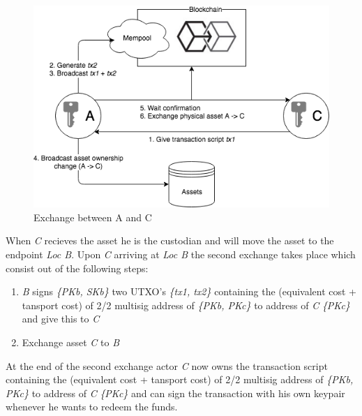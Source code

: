 \begin{figure}[h]
\centering
\includegraphics[width=1\textwidth]{images/exchange_01.png}
\caption{Exchange between A and C}
\label{fig:2 first exchange}
\end{figure}

 When \textit{C} recieves the asset he is the custodian and will move the asset to the endpoint \textit{Loc B}. Upon \textit{C} arriving at \textit{Loc B} the second exchange takes place which consist out of the following steps:

\begin{enumerate}
  \item \textit{B} signs \textit{\{PKb, SKb\}} two UTXO's \textit{\{tx1, tx2\}} containing the (equivalent cost + tansport cost) of 2/2 multisig address of \textit{\{PKb, PKc\}} to address of \textit{C} \textit{\{PKc\}} and give this to \textit{C}
  \item Exchange asset \textit{C} to \textit{B}
\end{enumerate}

At the end of the second exchange actor \textit{C} now owns the transaction script containing the (equivalent cost + tansport cost) of 2/2 multisig address of \textit{\{PKb, PKc\}} to address of \textit{C} \textit{\{PKc\}} and can sign the transaction with his own keypair whenever he wants to redeem the funds.
